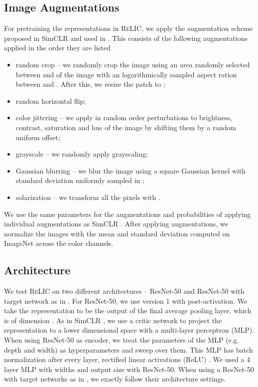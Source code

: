 \documentclass{article}
\newcommand{\relic}{\textsc{ReLIC}}
\begin{document}
\subsection{Image Augmentations} \label{sec:aug_app}
For pretraining the representations in \relic{}, we apply the augmentation scheme proposed in SimCLR \citep{chen2020simple} and used in \citep{grill2020bootstrap}.
This consists of the following augmentations applied in the order they are listed
\begin{itemize}
    \item random crop -- we randomly crop the image using an area randomly selected between  and  of the image with an logarithmically sampled aspect ration between  and . After this, we resize the patch to ;
    \item random horizontal flip;
    \item color jittering -- we apply in random order perturbations to brightness, contrast, saturation and hue of the image by shifting them by a random uniform offset;
    \item grayscale -- we randomly apply grayscaling;
    \item Gaussian blurring -- we blur the image using a  square Gaussian kernel with standard deviation uniformly sampled in ;
    \item solarization -- we transform all the pixels with .
\end{itemize}
We use the same parameters for the augmentations and probabilities of applying individual augmentations as SimCLR \citep{chen2020simple}.
After applying augmentations, we normalize the images with the mean and standard deviation computed on ImageNet across the color channels.

\subsection{Architecture}
We test \relic{} on two different architectures -- ResNet-50 \citep{he2016deep} and ResNet-50 with target network as in \citep{grill2020bootstrap}.
For ResNet-50, we use version 1 with post-activation.
We take the representation to be the output of the final average pooling layer, which is of dimension .
As in SimCLR \citep{chen2020simple}, we use a critic network to project the representation to a lower dimensional space with a multi-layer perceptron (MLP).
When using ResNet-50 as encoder, we treat the parameters of the MLP (e.g. depth and width) as hyperparameters and sweep over them.
This MLP has batch normalization \citep{Ioffe2015BatchNA} after every layer, rectified linear activations (ReLU) \citep{Nair2010RectifiedLU}.
We used a 4 layer MLP with widths  and output size  with ResNet-50.
When using a ResNet-50 with target networks as in \citep{grill2020bootstrap}, we exactly follow their architecture settings.
\end{document}
